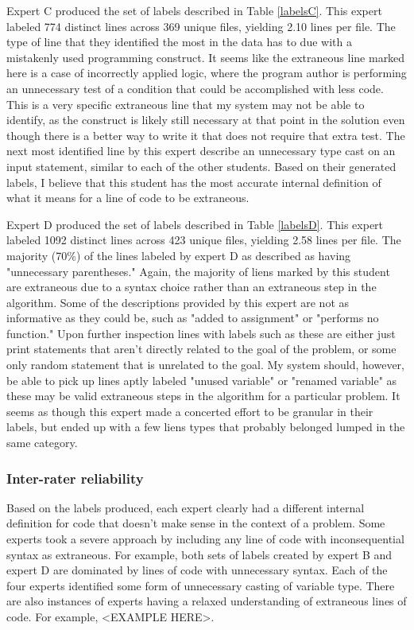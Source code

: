 Expert C produced the set of labels described in Table \ref{labelsC}. This expert labeled 774 distinct lines across 369 unique files, yielding 2.10 lines per file. The type of line that they identified the most in the data has to due with a mistakenly used programming construct. It seems like the extraneous line marked here is a case of incorrectly applied logic, where the program author is performing an unnecessary test of a condition that could be accomplished with less code. This is a very specific extraneous line that my system may not be able to identify, as the construct is likely still necessary at that point in the solution even though there is a better way to write it that does not require that extra test. The next most identified line by this expert describe an unnecessary type cast on an input statement, similar to each of the other students. Based on their generated labels, I believe that this student has the most accurate internal definition of what it means for a line of code to be extraneous. 



Expert D produced the set of labels described in Table \ref{labelsD}. This expert labeled 1092 distinct lines across 423 unique files, yielding 2.58 lines per file. The majority (70\%) of the lines labeled by expert D as described as having "unnecessary parentheses." Again, the majority of liens marked by this student are extraneous due to a syntax choice rather than an extraneous step in the algorithm. Some of the descriptions provided by this expert are not as informative as they could be, such as "added to assignment" or "performs no function." Upon further inspection lines with labels such as these are either just print statements that aren't directly related to the goal of the problem, or some only random statement that is unrelated to the goal. My system should, however, be able to pick up lines aptly labeled "unused variable" or "renamed variable" as these may be valid extraneous steps in the algorithm for a particular problem. It seems as though this expert made a concerted effort to be granular in their labels, but ended up with a few liens types that probably belonged lumped in the same category. 

\subsubsection{Inter-rater reliability}

Based on the labels produced, each expert clearly had a different internal definition for code that doesn't make sense in the context of a problem. Some experts took a severe approach by including any line of code with inconsequential syntax as extraneous. For example, both sets of labels created by expert B and expert D are dominated by lines of code with unnecessary syntax. Each of the four experts identified some form of unnecessary casting of variable type. There are also instances of experts having a relaxed understanding of extraneous lines of code. For example, <EXAMPLE HERE>. 


